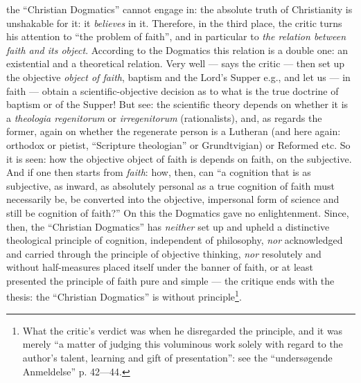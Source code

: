 \documentclass[12pt,a4paper]{book}
\begin{document}
the ``Christian Dogmatics'' cannot engage in: the absolute truth of Christianity is unshakable for it: it \emph{believes} in it. Therefore, in the third place, the critic turns his attention to ``the problem of faith'', and in particular to \emph{the relation between faith and its object}. According to the Dogmatics this relation is a double one: an existential and a theoretical relation. Very well --- says the critic --- then set up the objective \emph{object of faith}, baptism and the Lord's Supper e.g., and let us --- in faith --- obtain a scientific-objective decision as to what is the true doctrine of baptism or of the Supper! But see: the scientific theory depends on whether it is a \textit{theologia regenitorum} or \textit{irregenitorum} (rationalists), and, as regards the former, again on whether the regenerate person is a Lutheran (and here again: orthodox or pietist, ``Scripture theologian'' or Grundtvigian) or Reformed etc. So it is seen: how the objective object of faith is depends on faith, on the subjective. And if one then starts from \emph{faith}: how, then, can ``a cognition that is as subjective, as inward, as absolutely personal as a true cognition of faith must necessarily be, be converted into the objective, impersonal form of science and still be cognition of faith?'' On this the Dogmatics gave no enlightenment. Since, then, the ``Christian Dogmatics'' has \emph{neither} set up and upheld a distinctive theological principle of cognition, independent of philosophy, \emph{nor} acknowledged and carried through the principle of objective thinking, \emph{nor} resolutely and without half-measures placed itself under the banner of faith, or at least presented the principle of faith pure and simple --- the critique ends with the thesis: the ``Christian Dogmatics'' is without principle\footnote{What the critic's verdict was when he disregarded the principle, and it was merely ``a matter of judging this voluminous work solely with regard to the author's talent, learning and gift of presentation'': see the ``undersøgende Anmeldelse'' p. 42---44.}.
\end{document}
